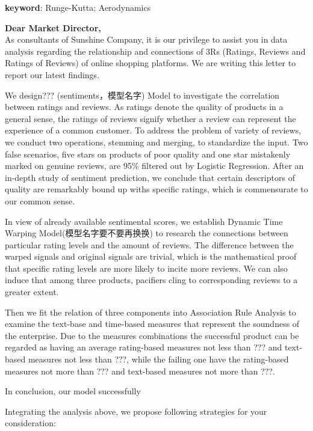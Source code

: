 \documentclass[12pt]{article}%
\begin{document}
\vspace{7pt}
\textbf{keyword}: Runge-Kutta; Aerodynamics



\newpage
\thispagestyle{empty}
{\large \textbf{Dear Market Director,}}
~\\

As consultants of Sunshine Company, it is our privilege to assist you in data analysis regarding the relationship and connections of 3Rs (Ratings, Reviews and Ratings of Reviews) of online shopping platforms. We are writing this letter to report our latest findings.

We design??? (sentiments，模型名字) Model to investigate the correlation between ratings and reviews. As ratings denote the quality of products in a general sense, the ratings of reviews signify whether a review can represent the experience of a common customer. To address the problem of variety of reviews, we conduct two operations, stemming and merging, to standardize the input. Two false scenarios, five stars on products of poor quality and one star mistakenly marked on genuine reviews, are 95\% filtered out by Logistic Regression. After an in-depth study of sentiment prediction, we conclude that certain descriptors of quality are remarkably bound up withs specific ratings, which is commensurate to our common sense.

In view of already available sentimental scores, we establish Dynamic Time Warping Model(模型名字要不要再换换) to research the connections between particular rating levels and the amount of reviews. The difference between the warped signals and original signals are trivial, which is the mathematical proof that specific rating levels are more likely to incite more reviews. We can also induce that among three products, pacifiers cling to corresponding reviews to a greater extent.

Then we fit the relation of three components into Association Rule Analysis to examine the text-base and time-based measures that represent the soundness of the enterprise. Due to the measures combinations the successful product can be regarded as having an average rating-based measures not less than ??? and text-based measures not less than ???, while the failing one have the rating-based measures not more than ??? and text-based measures not more than ???.

In conclusion, our model successfully 

Integrating the analysis above, we propose following strategies for your consideration:
\end{document}
